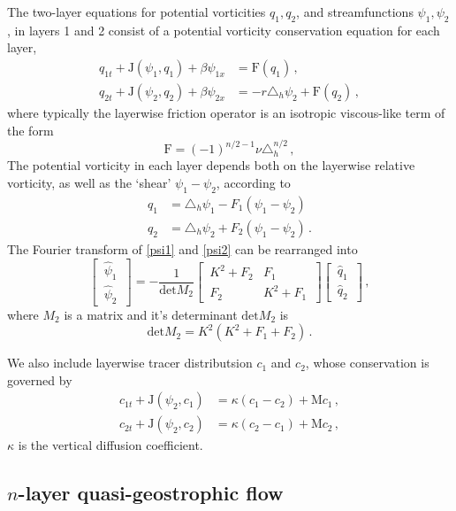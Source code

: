 \documentclass[12pt, oneside]{article}
\newcommand{\com}{\, ,}
\newcommand{\per}{\, .}
\newcommand{\beq}{\begin{equation}}
\newcommand{\eeq}{\end{equation}}
\newcommand{\hlap}{\triangle_h}
\newcommand{\J}{\mathrm{J}}
\newcommand{\friction}{\mathrm{F}}
\newcommand{\mixing}{\mathrm{M}}
\newcommand{\psih}{\hat \psi}
\newcommand{\qh}{\hat q}
\begin{document}
The two-layer equations for potential vorticities $q_1,q_2$, and streamfunctions $\psi_1, \psi_2$, in layers 1 and 2 consist of a potential vorticity conservation equation for each layer, 
\begin{align}
q_{1t} + \J \left ( \psi_1, q_1 \right ) + \beta \psi_{1x} &= \friction \left ( q_1 \right ) \com \\
q_{2t} + \J \left ( \psi_2, q_2 \right ) + \beta \psi_{2x} &= - r \hlap \psi_2 +  \friction \left ( q_2 \right ) \com
\end{align}
where typically the layerwise friction operator is an isotropic viscous-like term of the form
\beq
\friction = (-1)^{n/2-1} \nu \hlap^{n/2} \com
\eeq
The potential vorticity in each layer depends both on the layerwise relative vorticity, as well as the `shear' $\psi_1-\psi_2$, according to 
\begin{align}
q_1 &= \hlap \psi_1 - F_1 \left ( \psi_1 - \psi_2 \right ) \label{psi1} \\
q_2 &= \hlap \psi_2 + F_2 \left ( \psi_1 - \psi_2 \right ) \per \label{psi2}
\end{align}
The Fourier transform of \eqref{psi1} and \eqref{psi2} can be rearranged into 
\beq
 \left [ \, \begin{matrix}
\psih_1 \\
\psih_2
\end{matrix} \, \right ] = 
- \frac{1}{\text{det} M_2} \left [ \, \begin{matrix}
 K^2 + F_2 &  F_1 \\
F_2 & K^2 + F_1 
\end{matrix} \, \right ]  \left [ \, \begin{matrix}
\qh_1 \\
\qh_2
\end{matrix} \, \right ] \com
\eeq
where $M_2$ is a matrix and it's determinant $\text{det} M_2$ is
\beq
\text{det} M_2 = K^2 \left ( K^2 + F_1 + F_2 \right ) \per
\eeq

We also include layerwise tracer distributsion $c_1$ and $c_2$, whose conservation is governed by
\begin{align}
c_{1t} + \J \left ( \psi_2, c_1 \right ) &= \kappa \left ( c_1 - c_2 \right ) + \mixing c_1 \com \\
c_{2t} + \J \left ( \psi_2, c_2 \right ) &= \kappa \left ( c_2 - c_1 \right ) + \mixing c_2 \com 
\end{align}
$\kappa$ is the vertical diffusion coefficient.

\subsection{$n$-layer quasi-geostrophic flow}
\end{document}
